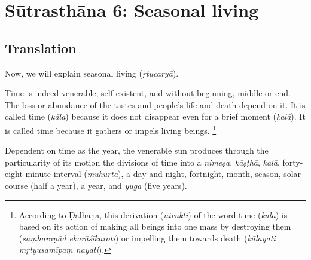 \chapter{Sūtrasthāna 6: Seasonal living}


\section{Translation}


\begin{translation}    
  
\item [1] 
Now, we will explain seasonal living (\emph{ṛtucaryā}).


\item [2] 
Time is indeed venerable, %
self-existent, and %
without beginning, middle or end. %
%
The loss or abundance of the tastes %
and people's life and death %
depend on it. %
It is called time (\emph{kāla}) because %
it does not disappear %
even for a brief moment (\emph{kalā}). %
It is called time because %
it gathers or impels living beings.%
    \footnote{According to Ḍalhaṇa, this derivation (\emph{nirukti}) of the word time (\emph{kāla}) is based on its action of making all beings into one mass by destroying them (\emph{saṃharaṇād ekarāśīkaroti}) or impelling them towards death (\emph{kālayati mṛtyusamīpaṃ nayati}).}

\item [3] 
Dependent on time as the year, %
the venerable sun %
produces  %
through the particularity of its motion %
the divisions of time %
into a \emph{nimeṣa}, %
\emph{kāṣṭhā}, %
\emph{kalā}, %
forty-eight minute interval (\emph{muhūrta}), %
a day and night, %
fortnight, %
month, %
season, %
solar course (half a year), %
a year, %
and \emph{yuga} (five years). %


\end{translation}
